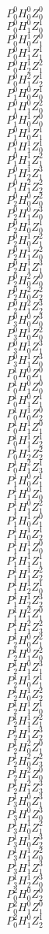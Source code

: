 \documentclass{article}
\begin{document}
\begin{multicols}{6}
\[ P^{0}_{0}  H^{0}_{0}  Z^{0}_{0}\]
\[ P^{0}_{0}  H^{0}_{1}  Z^{1}_{0}\]
\[ P^{0}_{0}  H^{1}_{0}  Z^{0}_{1}\]
\[ P^{0}_{0}  H^{1}_{1}  Z^{1}_{1}\]
\[ P^{0}_{0}  H^{1}_{2}  Z^{2}_{1}\]
\[ P^{0}_{0}  H^{2}_{1}  Z^{1}_{2}\]
\[ P^{0}_{1}  H^{0}_{0}  Z^{1}_{0}\]
\[ P^{0}_{1}  H^{0}_{1}  Z^{2}_{0}\]
\[ P^{0}_{1}  H^{1}_{0}  Z^{0}_{0}\]
\[ P^{0}_{1}  H^{1}_{0}  Z^{1}_{1}\]
\[ P^{0}_{1}  H^{1}_{1}  Z^{1}_{0}\]
\[ P^{0}_{1}  H^{1}_{1}  Z^{2}_{1}\]
\[ P^{0}_{1}  H^{1}_{2}  Z^{3}_{1}\]
\[ P^{0}_{1}  H^{2}_{1}  Z^{2}_{2}\]
\[ P^{0}_{2}  H^{0}_{0}  Z^{2}_{0}\]
\[ P^{0}_{2}  H^{0}_{1}  Z^{3}_{0}\]
\[ P^{0}_{2}  H^{1}_{0}  Z^{1}_{0}\]
\[ P^{0}_{2}  H^{1}_{0}  Z^{2}_{1}\]
\[ P^{0}_{2}  H^{1}_{1}  Z^{2}_{0}\]
\[ P^{0}_{2}  H^{1}_{1}  Z^{3}_{1}\]
\[ P^{0}_{2}  H^{2}_{0}  Z^{0}_{0}\]
\[ P^{0}_{2}  H^{2}_{0}  Z^{2}_{2}\]
\[ P^{0}_{2}  H^{2}_{1}  Z^{3}_{2}\]
\[ P^{0}_{3}  H^{0}_{0}  Z^{3}_{0}\]
\[ P^{0}_{3}  H^{1}_{0}  Z^{2}_{0}\]
\[ P^{0}_{3}  H^{1}_{0}  Z^{3}_{1}\]
\[ P^{0}_{3}  H^{1}_{1}  Z^{3}_{0}\]
\[ P^{1}_{0}  H^{0}_{0}  Z^{0}_{1}\]
\[ P^{1}_{0}  H^{0}_{1}  Z^{0}_{0}\]
\[ P^{1}_{0}  H^{0}_{1}  Z^{1}_{1}\]
\[ P^{1}_{0}  H^{1}_{0}  Z^{0}_{2}\]
\[ P^{1}_{0}  H^{1}_{1}  Z^{0}_{1}\]
\[ P^{1}_{0}  H^{1}_{1}  Z^{1}_{2}\]
\[ P^{1}_{0}  H^{1}_{2}  Z^{2}_{2}\]
\[ P^{1}_{0}  H^{2}_{1}  Z^{1}_{3}\]
\[ P^{1}_{1}  H^{0}_{0}  Z^{1}_{1}\]
\[ P^{1}_{1}  H^{0}_{1}  Z^{1}_{0}\]
\[ P^{1}_{1}  H^{0}_{1}  Z^{2}_{1}\]
\[ P^{1}_{1}  H^{1}_{0}  Z^{0}_{1}\]
\[ P^{1}_{1}  H^{1}_{0}  Z^{1}_{2}\]
\[ P^{1}_{1}  H^{1}_{1}  Z^{0}_{0}\]
\[ P^{1}_{1}  H^{1}_{1}  Z^{1}_{1}\]
\[ P^{1}_{1}  H^{1}_{1}  Z^{2}_{2}\]
\[ P^{1}_{1}  H^{1}_{2}  Z^{1}_{0}\]
\[ P^{1}_{1}  H^{1}_{2}  Z^{3}_{2}\]
\[ P^{1}_{1}  H^{2}_{1}  Z^{0}_{1}\]
\[ P^{1}_{1}  H^{2}_{1}  Z^{2}_{3}\]
\[ P^{1}_{2}  H^{0}_{0}  Z^{2}_{1}\]
\[ P^{1}_{2}  H^{0}_{1}  Z^{2}_{0}\]
\[ P^{1}_{2}  H^{0}_{1}  Z^{3}_{1}\]
\[ P^{1}_{2}  H^{1}_{0}  Z^{1}_{1}\]
\[ P^{1}_{2}  H^{1}_{0}  Z^{2}_{2}\]
\[ P^{1}_{2}  H^{1}_{1}  Z^{1}_{0}\]
\[ P^{1}_{2}  H^{1}_{1}  Z^{2}_{1}\]
\[ P^{1}_{2}  H^{1}_{1}  Z^{3}_{2}\]
\[ P^{1}_{2}  H^{2}_{0}  Z^{0}_{1}\]
\[ P^{1}_{2}  H^{2}_{0}  Z^{2}_{3}\]
\[ P^{1}_{2}  H^{2}_{1}  Z^{0}_{0}\]
\[ P^{1}_{2}  H^{2}_{1}  Z^{3}_{3}\]
\[ P^{1}_{3}  H^{0}_{0}  Z^{3}_{1}\]
\[ P^{1}_{3}  H^{0}_{1}  Z^{3}_{0}\]
\[ P^{1}_{3}  H^{1}_{0}  Z^{2}_{1}\]
\[ P^{1}_{3}  H^{1}_{0}  Z^{3}_{2}\]
\[ P^{1}_{3}  H^{1}_{1}  Z^{2}_{0}\]
\[ P^{1}_{3}  H^{1}_{1}  Z^{3}_{1}\]
\[ P^{1}_{3}  H^{1}_{2}  Z^{3}_{0}\]
\[ P^{2}_{0}  H^{0}_{0}  Z^{0}_{2}\]
\[ P^{2}_{0}  H^{0}_{1}  Z^{0}_{1}\]
\[ P^{2}_{0}  H^{0}_{1}  Z^{1}_{2}\]

\end{multicols}
\end{document}
